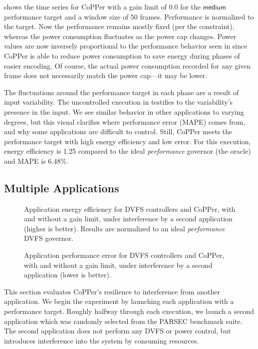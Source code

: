  shows the time series for CoPPer with a gain limit of 0.0 for the $\mathsf{medium}$ performance target and a window size of 50 frames.
Performance is normalized to the target.
Now the performance remains mostly fixed (per the constraint), whereas the power consumption fluctuates as the power cap changes.
Power values are now inversely proportional to the performance behavior seen in  since CoPPer is able to reduce power consumption to save energy during phases of easier encoding.
Of course, the actual power consumption recorded for any given frame does not necessarily match the power cap---it may be lower.

The fluctuations around the performance target in each phase are a result of input variability.
The uncontrolled execution in  testifies to the variability's presence in the input.
We see similar behavior in other applications to varying degrees, but this visual clarifies where performance error (MAPE) comes from, and why some applications are difficult to control.
Still, CoPPer meets the performance target with high energy efficiency and low error.
For this execution, energy efficiency is 1.25 compared to the ideal \emph{performance} governor (the oracle) and MAPE is 6.48\%.


\subsection{Multiple Applications}
\label{sec:copper-eval-multiapp}

\begin{figure}[t]
  \centering
  
  \caption{Application energy efficiency for DVFS controllers and CoPPer, with and without a gain limit, under interference by a second application (higher is better). Results are normalized to an ideal \emph{performance} DVFS governor.}
  \label{fig:copper-multi-ee}
\end{figure}

\begin{figure}[t]
  \centering
  
  \caption{Application performance error for DVFS controllers and CoPPer, with and without a gain limit, under interference by a second application (lower is better).}
  \label{fig:copper-multi-mape}
\end{figure}

This section evaluates CoPPer's resilience to interference from
another application.
We begin the experiment by launching each application with a performance target.
Roughly halfway through each execution, we launch a second application which was randomly selected from the PARSEC benchmark suite.
The second application does not perform any DVFS or power control, but introduces interference into the system by consuming resources.


